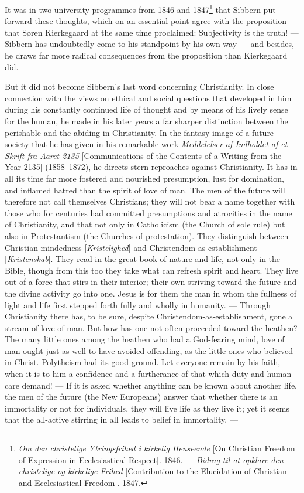 \documentclass[12pt,a4paper]{book}
\newcommand{\opage}[1]{\marginnote{\footnotesize\textit{[#1]}}}
\begin{document}
\opage{108}It was in two university programmes from 1846 and 1847\footnote{\emph{Om den christelige
Ytringsfrihed i kirkelig Henseende} [On Christian Freedom of Expression in Ecclesiastical
Respect]. 1846. --- \emph{Bidrag til at opklare den christelige og kirkelige Frihed}
[Contribution to the Elucidation of Christian and Ecclesiastical Freedom]. 1847.} that Sibbern
put forward these thoughts, which on an essential point agree with the proposition that Søren
Kierkegaard at the same time proclaimed: Subjectivity is the truth! --- Sibbern has undoubtedly
come to his standpoint by his own way --- and besides, he draws far more radical consequences
from the proposition than Kierkegaard did.

But it did not become Sibbern's last word concerning Christianity. In close connection with the
views on ethical and social questions that developed in him during his constantly continued
life of thought and by means of his lively sense for the human, he made in his later years a
far sharper distinction between the perishable and the abiding in Christianity. In the
fantasy-image of a future society that he has given in his remarkable work \emph{Meddelelser af
Indholdet af et Skrift fra Aaret 2135} [Communications of the Contents of a Writing from the
Year 2135] (1858--1872), he directs stern reproaches against Christianity. It has in all its
time far more fostered and nourished presumption, lust for domination, and inflamed hatred than
the spirit of love of man. The men of the future will therefore not call themselves Christians;
they will not bear a name together with those who for centuries had committed presumptions and
atrocities in the name of Christianity, and that not only in Catholicism (the Church of sole
rule) but also in Protestantism (the Churches of protestation). They distinguish between
Christian-mindedness [\emph{Kristelighed}] and Christendom-as-establishment [\emph{Kristenskab}].
They read in the great book of nature and life, not only in the Bible, though from this too they
take what can refresh spirit and heart. They live out of a force that stirs in their interior;
their own striving toward the future and the divine activity go into one. Jesus is for them the
man in whom the fullness of light and life first stepped forth fully and wholly in humanity. ---
Through Christianity there has, to be sure, despite Christendom-as-establishment, gone a stream
of love of man. But how has one not often proceeded toward the heathen? The many little ones
among the heathen who had a God-fearing mind, \opage{109}love of man ought just as well to have avoided
offending, as the little ones who believed in Christ. Polytheism had its good ground. Let
everyone remain by his faith, when it is to him a confidence and a furtherance of that which
duty and human care demand! --- If it is asked whether anything can be known about another life,
the men of the future (the New Europeans) answer that whether there is an immortality or not for
individuals, they will live life as they live it; yet it seems that the all-active stirring in
all leads to belief in immortality. ---
\end{document}
